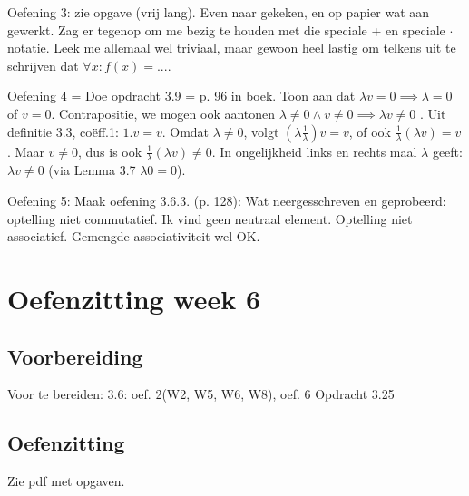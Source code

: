 \documentclass{article}
\begin{document}
Oefening 3: zie opgave (vrij lang). Even naar gekeken, en op papier wat aan gewerkt. Zag er tegenop om me bezig te houden met die speciale + en speciale $\cdot$ notatie. Leek me allemaal wel triviaal, maar gewoon heel lastig om telkens uit te schrijven dat $\forall x: f(x)=...$. 

Oefening 4 = Doe opdracht 3.9 = p. 96 in boek. Toon aan dat $\lambda v = 0 \implies \lambda = 0$ of $v=0$. Contrapositie, we mogen ook aantonen $\lambda \neq 0 \land v \neq 0 \implies  \lambda v \neq 0$ . Uit definitie 3.3, co\"eff.1: $1.v = v$. Omdat $\lambda \neq 0$, volgt $ (\lambda \frac{1}{\lambda}) v = v$, of ook $  \frac{1}{\lambda} ( \lambda v ) = v$. Maar $v \neq 0$, dus is ook $  \frac{1}{\lambda} ( \lambda v ) \neq 0 $. In ongelijkheid links en rechts maal $\lambda$ geeft: $ \lambda v \neq 0$ (via Lemma 3.7 $\lambda 0 = 0$). 

Oefening 5: Maak oefening 3.6.3. (p. 128): Wat neergesschreven en geprobeerd: optelling niet commutatief. Ik vind geen neutraal element. Optelling niet associatief. Gemengde associativiteit wel OK.  



\section{Oefenzitting week 6}

\subsection{Voorbereiding}
Voor te bereiden: 3.6: 
oef. 2(W2, W5, W6, W8), 
oef. 6
Opdracht 3.25

\subsection{Oefenzitting}
Zie pdf met opgaven. 
\end{document}
